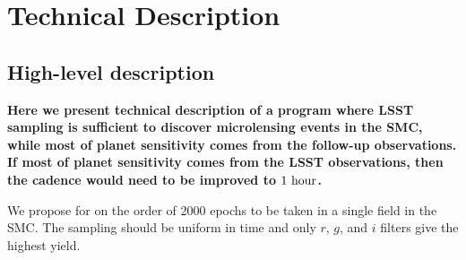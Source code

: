 \documentclass[12pt,letterpaper]{article}
\begin{document}





\vspace{.6in}

\section{Technical Description}



\subsection{High-level description}

{\bf Here we present technical description of a program where LSST 
sampling is sufficient to discover microlensing events in the SMC, 
while most of planet sensitivity comes from the follow-up observations.  
If most of planet sensitivity comes from the LSST observations, 
then the cadence would need to be improved to $1~{\rm hour}$.  
}

We propose for on the order of 2000 epochs %
to be taken in a single field in the SMC.  
The sampling should be uniform in time and only $r$, $g$, and $i$ 
filters give the highest yield.
\end{document}
